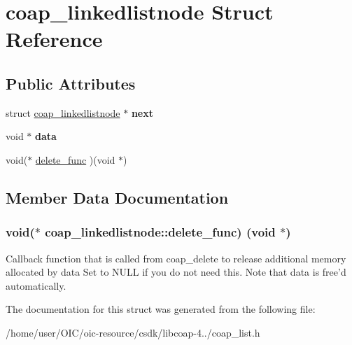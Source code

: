 \hypertarget{structcoap__linkedlistnode}{}\section{coap\+\_\+linkedlistnode Struct Reference}
\label{structcoap__linkedlistnode}
\subsection*{Public Attributes}
\begin{DoxyCompactItemize}
\item 
\hypertarget{structcoap__linkedlistnode_afb9288a82fb0887064f56cf325a0bd1d}{}struct \hyperlink{structcoap__linkedlistnode}{coap\+\_\+linkedlistnode} $\ast$ {\bfseries next}\label{structcoap__linkedlistnode_afb9288a82fb0887064f56cf325a0bd1d}

\item 
\hypertarget{structcoap__linkedlistnode_adf9a0c8eb399fc23eec324f4dff129ed}{}void $\ast$ {\bfseries data}\label{structcoap__linkedlistnode_adf9a0c8eb399fc23eec324f4dff129ed}

\item 
void($\ast$ \hyperlink{structcoap__linkedlistnode_a0eb5c495e0bbcdf7e334b485e8a29aac}{delete\+\_\+func} )(void $\ast$)
\end{DoxyCompactItemize}


\subsection{Member Data Documentation}
\hypertarget{structcoap__linkedlistnode_a0eb5c495e0bbcdf7e334b485e8a29aac}{}
\subsubsection[{delete\+\_\+func}]{\setlength{\rightskip}{0pt plus 5cm}void($\ast$ coap\+\_\+linkedlistnode\+::delete\+\_\+func) (void $\ast$)}\label{structcoap__linkedlistnode_a0eb5c495e0bbcdf7e334b485e8a29aac}
Callback function that is called from coap\+\_\+delete to release additional memory allocated by data Set to N\+U\+L\+L if you do not need this. Note that data is free'd automatically. 

The documentation for this struct was generated from the following file\+:\begin{DoxyCompactItemize}
\item 
/home/user/\+O\+I\+C/oic-\/resource/csdk/libcoap-\/4../coap\+\_\+list.\+h\end{DoxyCompactItemize}
